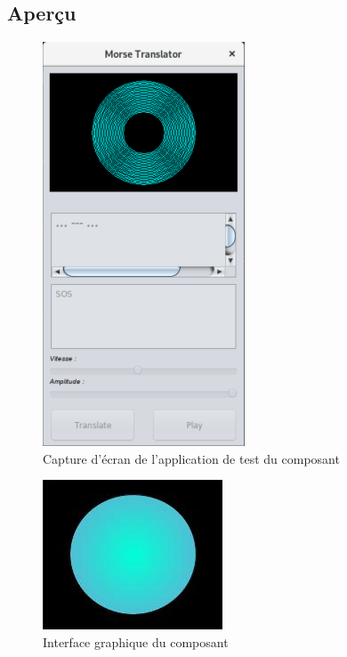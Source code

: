 \documentclass[a4paper,11pt]{article}
\begin{document}
	
    \subsection{Aperçu}
    \begin{figure}[H]
    	\begin{center}
    		\includegraphics[scale=0.9]{descpicture.png}
    		\caption{Capture d'écran de l'application de test du composant}
    		\label{Capture d'écran de l'application de test du composant}
    	\end{center}
    \end{figure}
    
	\begin{figure}[H]
		\begin{center}
			\includegraphics[scale=0.8]{comdescpicture.jpg}
			\caption{Interface graphique du composant}
			\label{Interface graphique du composant}
		\end{center}
	\end{figure}
\end{document}
